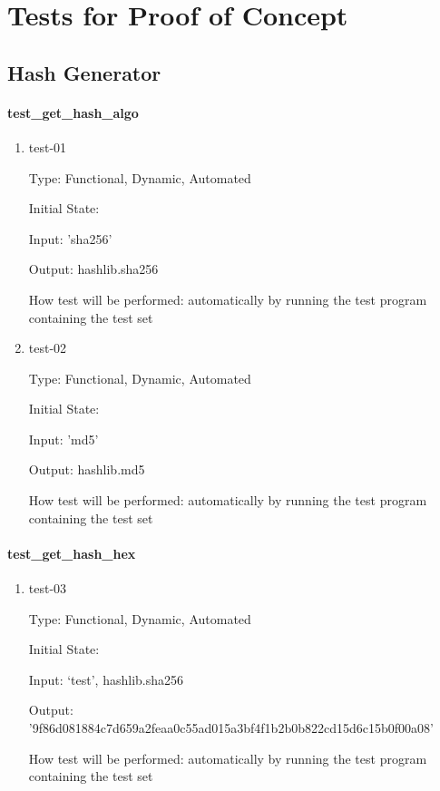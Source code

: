 \documentclass[12pt, titlepage]{article}
\begin{document}
\section{Tests for Proof of Concept}

\subsection{Hash Generator}
		
\paragraph{test\_get\_hash\_algo}

\begin{enumerate}

\item{test-01\\}

Type: Functional, Dynamic, Automated

Initial State:

Input: 'sha256'

Output: hashlib.sha256

How test will be performed: automatically by running the test program
containing the test set

\item{test-02\\}

Type: Functional, Dynamic, Automated

Initial State:

Input: 'md5'

Output: hashlib.md5

How test will be performed: automatically by running the test program
containing the test set

\end{enumerate}

\paragraph{test\_get\_hash\_hex}

\begin{enumerate}

\item{test-03\\}

Type: Functional, Dynamic, Automated

Initial State:

Input: ‘test’, hashlib.sha256

Output: '9f86d081884c7d659a2feaa0c55ad015a3bf4f1b2b0b822cd15d6c15b0f00a08'

How test will be performed: automatically by running the test program
containing the test set

\end{enumerate}
\end{document}
